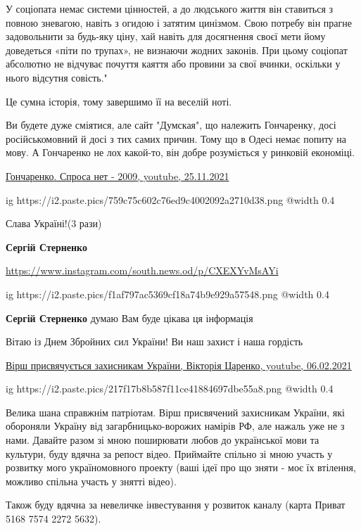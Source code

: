 \begin{itemize}
У соціопата немає системи цінностей, а до людського життя він ставиться з
повною зневагою, навіть з огидою і затятим цинізмом. Свою потребу він прагне
задовольнити за будь-яку ціну, хай навіть для досягнення своєї мети йому
доведеться «піти по трупах», не визнаючи жодних законів. При цьому соціопат
абсолютно не відчуває почуття каяття або провини за свої вчинки, оскільки у
нього відсутня совість."

Це сумна історія, тому завершимо її на веселій ноті.

Ви будете дуже сміятися, але сайт "Думская", що належить Гончаренку, досі
російськомовний й досі з тих самих причин. Тому що в Одесі немає попиту на
мову. А Гончаренко не лох какой-то, він добре розуміється у ринковій економіці.

\href{https://youtu.be/JeJPz7P54MI}{%
Гончаренко. Спроса нет - 2009, youtube, 25.11.2021%
}

\ifcmt
  ig https://i2.paste.pics/759c75c602c76ed9c4002092a2710d38.png
  @width 0.4
\fi


Слава Україні!(3 рази)

\textbf{Сергій Стерненко}

\url{https://www.instagram.com/south.news.od/p/CXEXYvMsAYi}

\ifcmt
  ig https://i2.paste.pics/f1af797ac5369cf18a74b9e929a57548.png
  @width 0.4
\fi

\textbf{Сергій Стерненко} думаю Вам буде цікава ця інформація


Вітаю із Днем Збройних сил України! Ви наш захист і наша гордість 

\href{https://youtu.be/NWE8BsN7sdI}{%
Вірш присвячується захисникам України, Вікторія Царенко, youtube, 06.02.2021%
}

\ifcmt
  ig https://i2.paste.pics/217f17b8b587f11ce41884697dbe55a8.png
  @width 0.4
\fi

Велика шана  справжнім патріотам. Вірш присвячений захисникам України, які
обороняли Україну від загарбницько-ворожих намірів РФ, але нажаль уже не з
нами. Давайте разом зі мною поширювати любов до української мови та культури,
буду вдячна за репост відео. Приймайте спільно зі мною участь у розвитку мого
україномовного проекту (ваші ідеї про що зняти - моє їх втілення, можливо
спільна участь у знятті відео).  

Також буду вдячна  за невеличке інвестування у розвиток каналу (карта Приват
5168 7574 2272 5632). 
                           

\end{itemize}
